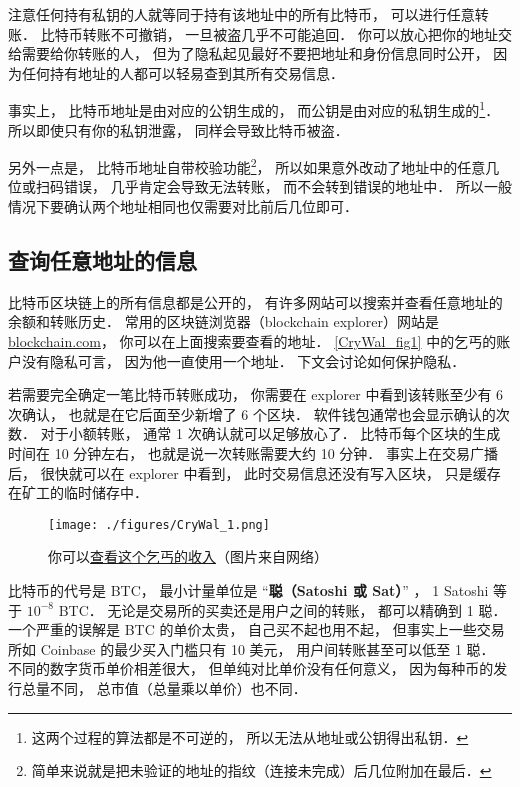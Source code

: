 注意任何持有私钥的人就等同于持有该地址中的所有比特币， 可以进行任意转账． 比特币转账不可撤销， 一旦被盗几乎不可能追回． 你可以放心把你的地址交给需要给你转账的人， 但为了隐私起见最好不要把地址和身份信息同时公开， 因为任何持有地址的人都可以轻易查到其所有交易信息．

事实上， 比特币地址是由对应的公钥生成的， 而公钥是由对应的私钥生成的\footnote{这两个过程的算法都是不可逆的， 所以无法从地址或公钥得出私钥．}． 所以即使只有你的私钥泄露， 同样会导致比特币被盗．

另外一点是， 比特币地址自带校验功能\footnote{简单来说就是把未验证的地址的指纹（连接未完成）后几位附加在最后．}， 所以如果意外改动了地址中的任意几位或扫码错误， 几乎肯定会导致无法转账， 而不会转到错误的地址中． 所以一般情况下要确认两个地址相同也仅需要对比前后几位即可．

\subsection{查询任意地址的信息}
比特币区块链上的所有信息都是公开的， 有许多网站可以搜索并查看任意地址的余额和转账历史． 常用的区块链浏览器（blockchain explorer）网站是 \href{https://blockchain.com}{blockchain.com}， 你可以在上面搜索要查看的地址． \autoref{CryWal_fig1} 中的乞丐的账户没有隐私可言， 因为他一直使用一个地址． 下文会讨论如何保护隐私．

若需要完全确定一笔比特币转账成功， 你需要在 explorer 中看到该转账至少有 6 次确认， 也就是在它后面至少新增了 6 个区块． 软件钱包通常也会显示确认的次数． 对于小额转账， 通常 1 次确认就可以足够放心了． 比特币每个区块的生成时间在 10 分钟左右， 也就是说一次转账需要大约 10 分钟． 事实上在交易广播后， 很快就可以在 explorer 中看到， 此时交易信息还没有写入区块， 只是缓存在矿工的临时储存中．
\begin{figure}[ht]
\centering
\texttt{[image: ./figures/CryWal\_1.png]}
\caption{你可以\href{https://www.blockchain.com/btc/address/1DBqpfptUMizLDACvMVsrJFPdMtbgmZCk1}{查看这个乞丐的收入}（图片来自网络）} \label{CryWal_fig1}
\end{figure}

比特币的代号是 BTC， 最小计量单位是 “\textbf{聪（Satoshi 或 Sat）}” ， 1 Satoshi 等于 $10^{-8}$ BTC． 无论是交易所的买卖还是用户之间的转账， 都可以精确到 1 聪． 一个严重的误解是 BTC 的单价太贵， 自己买不起也用不起， 但事实上一些交易所如 Coinbase 的最少买入门槛只有 10 美元， 用户间转账甚至可以低至 1 聪． 不同的数字货币单价相差很大， 但单纯对比单价没有任何意义， 因为每种币的发行总量不同， 总市值（总量乘以单价）也不同．

